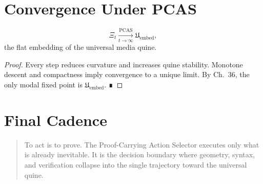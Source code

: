 \section{Convergence Under PCAS}

\begin{theorem}
\[
\Xi_t \xrightarrow[t\to\infty]{\text{PCAS}}
\mathfrak{U}_{\mathrm{embed}},
\]
the flat embedding of the universal media quine.
\end{theorem}

\begin{proof}
Every step reduces curvature and increases quine stability.
Monotone descent and compactness imply convergence to a unique limit.  
By Ch.~36, the only modal fixed point is $\mathfrak{U}_{\mathrm{embed}}$. ∎
\end{proof}

\section{Final Cadence}

\begin{quote}
To act is to prove.  
The Proof-Carrying Action Selector executes only what is already inevitable.  
It is the decision boundary where geometry, syntax, and verification collapse  
into the single trajectory toward the universal quine.
\end{quote}


